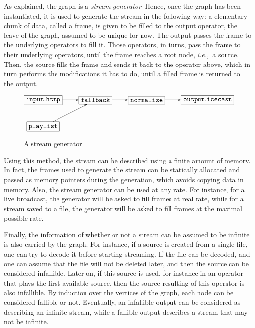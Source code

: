 \documentclass{llncs}
\newcommand{\ie}{{\em i.e.,}}
\begin{document}
As explained, the graph is a \textit{stream generator}. Hence, once the graph has been instantiated,
it is used to generate the stream in the following way: a elementary chunk of data, called a frame, is given to be filled to the 
output operator, the leave of the graph, assumed to be unique for now. 
The output passes the frame to the underlying operators to fill it. Those operators, in turns, pass the frame to their 
underlying operators, until the frame reaches a root node, \ie\ a source. 
Then, the source fills the frame and sends it back to the operator above, which in turn performs
the modifications it has to do, until a filled frame is returned to the output.

\begin{figure}[htn]
 \begin{center}
\[
\xymatrix{
  *+[F]{\mathtt{input.http}}\ar[r]&*+[F]{\mathtt{fallback}}\ar[r]&
  *+[F]{\mathtt{normalize}}\ar[r]&
  *+[F]{\mathtt{output.icecast}}\\
  *+[F]{\mathtt{playlist}}\ar[ur]&\\
}
\]
\end{center}
 \caption{A stream generator}
\end{figure}

Using this method, the stream can be described using a finite amount of memory. In fact, the frames used
to generate the stream can be statically allocated and passed as memory pointers during the generation, which 
avoids copying data in memory. Also, the stream generator can be used at any rate. For instance,
for a live broadcast, the generator will be asked to fill frames at real rate, while 
for a stream saved to a file, the generator will be asked to fill frames at the maximal possible rate.

Finally, the information of whether or not a stream can be assumed to be infinite is also carried by the 
graph. For instance, if a source is created from a single file, one can try to decode it before starting 
streaming. If the file can be decoded, and one can assume that the file will not be deleted later, and then 
the source can be considered infallible. Later on, if this source is used, for instance in an operator that plays 
the first available source, then the source resulting of this operator is also infallible.
By induction over the vertices of the graph, each node can be considered fallible or not. Eventually,
an infallible output can be considered as describing an infinite stream, while a fallible
output describes a stream that may not be infinite.
\end{document}
